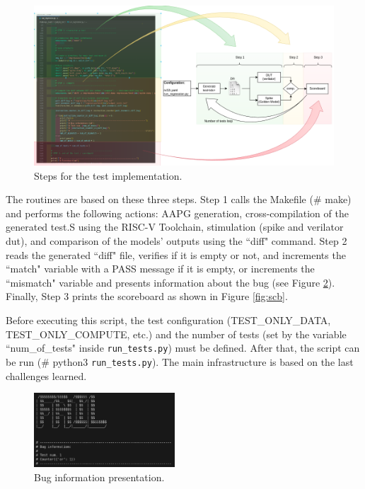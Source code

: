 \begin{figure} %
    \centering
    \includegraphics[width=1\textwidth]{./c3l1_img/implement.png} %
    \caption{Steps for the test implementation.}
    \label{fig:implement}
\end{figure}

The routines are based on these three steps. Step 1 calls the Makefile (\# make) and performs the following actions: AAPG generation, cross-compilation of the generated test.S using the RISC-V Toolchain, stimulation (spike and verilator dut), and comparison of the models' outputs using the ``diff" command. Step 2 reads the generated ``diff" file, verifies if it is empty or not, and increments the ``match" variable with a PASS message if it is empty, or increments the ``mismatch" variable and presents information about the bug (see Figure \ref{fig:fail}). Finally, Step 3 prints the scoreboard as shown in Figure \ref{fig:scb}. 

Before executing this script, the test configuration (TEST\_ONLY\_DATA, TEST\_ONLY\_COMPUTE, etc.) and the number of tests (set by the variable ``num\_of\_tests" inside \texttt{run\_tests.py}) must be defined. After that, the script can be run (\# python3 \texttt{run\_tests.py}). The main infrastructure is based on the last challenges learned.

\begin{figure}[H]
    \centering
    \includegraphics[width=0.47\textwidth]{./c3l1_img/fail.png}
    \caption{Bug information presentation.}
    \label{fig:fail}
\end{figure}


